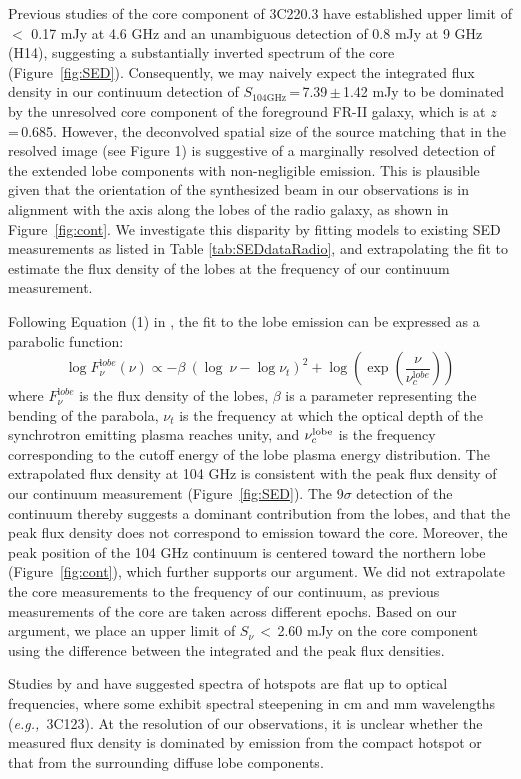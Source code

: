 \documentclass[twocolumn,apj,numberedappendix]{emulateapj}
\newcommand{\eg}{{\sl e.g.,~}}
\begin{document}
Previous studies of the core component of 3C220.3 have established upper 
limit of $<$ 0.17 mJy at 4.6 GHz \citep{Mullin06a} and an unambiguous detection of 0.8 mJy at 9 GHz (H14), suggesting a substantially inverted spectrum of the core (Figure~\ref{fig:SED}).
Consequently, we may naively expect the integrated flux density in our continuum detection of $S_\textrm{104GHz}$\,=\,7.39\,$\pm$\,1.42\,\,mJy to be dominated by the unresolved core component of the foreground FR-II galaxy, which is at $z$\,=\,0.685. 
However, the deconvolved spatial size of the source matching that in the resolved image (see Figure 1) is 
suggestive of a marginally resolved detection of the extended lobe components with non-negligible emission. 
This is plausible given that the orientation of the synthesized beam in our observations is in alignment with the 
axis along the 
lobes of the radio galaxy, as shown in Figure~\ref{fig:cont}. We investigate this disparity by fitting models to 
existing SED measurements as listed in Table \ref{tab:SEDdataRadio}, and extrapolating the fit to 
estimate the flux density of the lobes at the frequency of our continuum measurement. 

Following Equation (1) in \citet{Cleary07a}, the fit to the lobe emission can be expressed as a parabolic function:
\begin{equation}
\log F_{\nu}^{\mathrm lobe} (\nu) \propto - \beta\ (\log\ \nu - \log \nu_{t})^2  + \log (\exp({\frac{\nu}{\nu_c^{\mathrm lobe}}}))
\end{equation}
where $F_{\nu}^{\mathrm lobe}$ is the flux density of the lobes, $\beta$ is a parameter representing the bending 
of the parabola, $\nu_t$ is the frequency at which the optical depth of the synchrotron emitting plasma reaches 
unity, and $\nu_c^{\rm lobe}$ is the frequency corresponding to the cutoff energy of the lobe plasma energy 
distribution. 
The extrapolated flux density at 104\,\,GHz is consistent with the peak flux density of our continuum 
measurement (Figure~\ref{fig:SED}). The 9$\sigma$ detection of the continuum thereby suggests
a dominant contribution from the lobes, and that the peak flux density does not correspond to emission toward 
the core. Moreover, the peak position of the 104\,\,GHz continuum is
centered toward the northern lobe (Figure~\ref{fig:cont}), which further supports our argument. We did not 
extrapolate the core measurements to the frequency of our continuum, as previous measurements of the core are 
taken 
across different epochs. 
Based on our argument, we place an upper limit of $S_\nu$\,$<$\,2.60 mJy on the core component using the difference between the integrated and the peak flux densities.
\par
Studies by \citet{Meisenheimer89a} and \citet{Hardcastle08a} have suggested spectra of hotspots are flat up to optical frequencies, where some exhibit spectral steepening in cm and mm wavelengths (\eg 3C123). At the resolution of our observations, it is unclear whether the measured flux density is dominated by emission from the compact hotspot or that from the surrounding diffuse lobe components.
\end{document}
